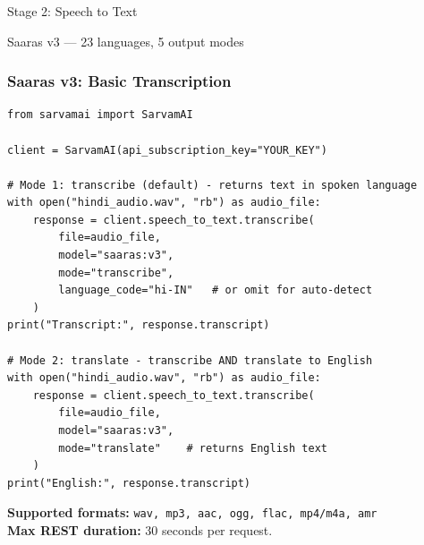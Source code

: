 \begin{frame}[fragile]\frametitle{}
\begin{center}
{\Large Stage 2: Speech to Text}

{\normalsize Saaras v3 --- 23 languages, 5 output modes}
\end{center}
\end{frame}

\begin{frame}[fragile]\frametitle{Saaras v3: Basic Transcription}
\begin{lstlisting}
from sarvamai import SarvamAI

client = SarvamAI(api_subscription_key="YOUR_KEY")

# Mode 1: transcribe (default) - returns text in spoken language
with open("hindi_audio.wav", "rb") as audio_file:
    response = client.speech_to_text.transcribe(
        file=audio_file,
        model="saaras:v3",
        mode="transcribe",
        language_code="hi-IN"   # or omit for auto-detect
    )
print("Transcript:", response.transcript)

# Mode 2: translate - transcribe AND translate to English
with open("hindi_audio.wav", "rb") as audio_file:
    response = client.speech_to_text.transcribe(
        file=audio_file,
        model="saaras:v3",
        mode="translate"    # returns English text
    )
print("English:", response.transcript)
\end{lstlisting}
\textbf{Supported formats:} \texttt{wav, mp3, aac, ogg, flac, mp4/m4a, amr}\\
\textbf{Max REST duration:} 30 seconds per request.
\end{frame}

